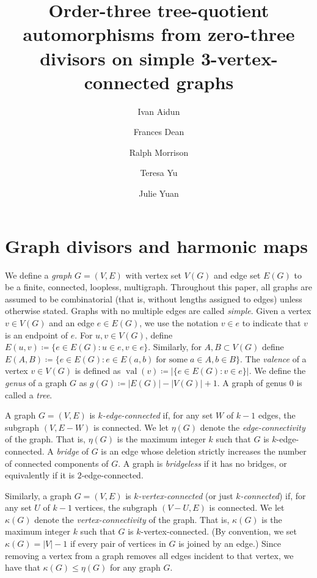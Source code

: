 \documentclass[10pt]{amsart}
\DeclareMathOperator{\val}{val}
\begin{document}
\title{Order-three tree-quotient automorphisms from zero-three divisors on simple 3-vertex-connected graphs}
\author{Ivan Aidun \and Frances Dean \and Ralph Morrison \and Teresa Yu \and Julie Yuan}
\maketitle
\section{Graph divisors and harmonic maps}
We define a \emph{graph} $G = (V, E)$ with vertex set $V(G)$ and edge set $E(G)$ to be a finite, connected, loopless, multigraph. Throughout this paper, all graphs are assumed to be combinatorial (that is, without lengths assigned to edges) unless otherwise stated. Graphs with no multiple edges are called \emph{simple}. Given a vertex $v \in V(G)$ and an edge $e \in E(G)$, we use the notation $v \in e$ to indicate that $v$ is an endpoint of $e$. For $u,v \in V(G)$, define $E(u,v) \coloneqq \{ e \in E(G) : u \in e, v \in e\}$. Similarly, for $A, B \subset V(G)$ define $E(A, B) \coloneqq \{ e \in E(G) : e \in E(a, b) \; \text{for some} \; a \in A, b \in B\}$. The \emph{valence} of a vertex $v \in V(G)$ is defined as $\val (v) \coloneqq |\{ e \in E(G) : v \in e \}|$. We define the \emph{genus} of a graph $G$ as $g(G) \coloneqq |E(G)| - |V(G)| + 1$. A graph of genus 0 is called a \emph{tree}.

A graph $G = (V, E)$ is \emph{$k$-edge-connected} if, for any set $W$ of $k-1$ edges, the subgraph $(V,E-W)$ is connected. We let $\eta(G)$ denote the \emph{edge-connectivity} of the graph. That is, $\eta(G)$ is the maximum integer $k$ such that $G$ is $k$-edge-connected. A \emph{bridge} of $G$ is an edge whose deletion strictly increases the number of connected components of $G$. A graph is \emph{bridgeless} if it has no bridges, or equivalently if it is $2$-edge-connected.

Similarly, a graph $G = (V, E)$ is \emph{$k$-vertex-connected} (or just \emph{$k$-connected}) if, for any set $U$ of $k-1$ vertices, the subgraph $(V-U,E)$ is connected. We let $\kappa(G)$ denote the \emph{vertex-connectivity} of the graph. That is, $\kappa(G)$ is the maximum integer $k$ such that $G$ is $k$-vertex-connected. (By convention, we set $\kappa(G)=|V|-1$ if every pair of vertices in $G$ is joined by an edge.) Since removing a vertex from a graph removes all edges incident to that vertex, we have that $\kappa(G)\leq \eta(G)$ for any graph $G$.
\end{document}
